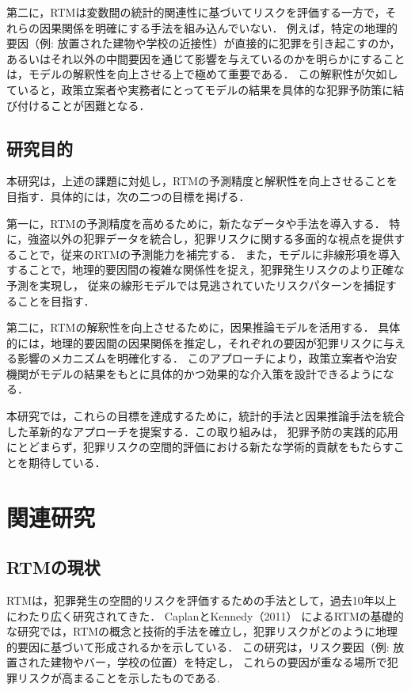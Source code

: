 \documentclass[12pt,a4paper,oneside]{jsbook}
\theoremstyle{plain}
\begin{document}
第二に，RTMは変数間の統計的関連性に基づいてリスクを評価する一方で，それらの因果関係を明確にする手法を組み込んでいない．
例えば，特定の地理的要因（例: 放置された建物や学校の近接性）が直接的に犯罪を引き起こすのか，
あるいはそれ以外の中間要因を通じて影響を与えているのかを明らかにすることは，モデルの解釈性を向上させる上で極めて重要である．
この解釈性が欠如していると，政策立案者や実務者にとってモデルの結果を具体的な犯罪予防策に結び付けることが困難となる．
\section{研究目的}
本研究は，上述の課題に対処し，RTMの予測精度と解釈性を向上させることを目指す．具体的には，次の二つの目標を掲げる．

第一に，RTMの予測精度を高めるために，新たなデータや手法を導入する．
特に，強盗以外の犯罪データを統合し，犯罪リスクに関する多面的な視点を提供することで，従来のRTMの予測能力を補完する．
また，モデルに非線形項を導入することで，地理的要因間の複雑な関係性を捉え，犯罪発生リスクのより正確な予測を実現し，
従来の線形モデルでは見逃されていたリスクパターンを捕捉することを目指す．

第二に，RTMの解釈性を向上させるために，因果推論モデルを活用する．
具体的には，地理的要因間の因果関係を推定し，それぞれの要因が犯罪リスクに与える影響のメカニズムを明確化する．
このアプローチにより，政策立案者や治安機関がモデルの結果をもとに具体的かつ効果的な介入策を設計できるようになる．

本研究では，これらの目標を達成するために，統計的手法と因果推論手法を統合した革新的なアプローチを提案する．この取り組みは，
犯罪予防の実践的応用にとどまらず，犯罪リスクの空間的評価における新たな学術的貢献をもたらすことを期待している．

\chapter{関連研究}
\label{chapter_2}
\section{RTMの現状}
RTMは，犯罪発生の空間的リスクを評価するための手法として，過去10年以上にわたり広く研究されてきた．
CaplanとKennedy（2011）
\cite{caplan2011}
によるRTMの基礎的な研究では，RTMの概念と技術的手法を確立し，犯罪リスクがどのように地理的要因に基づいて形成されるかを示している．
この研究は，リスク要因（例: 放置された建物やバー，学校の位置）を特定し，
これらの要因が重なる場所で犯罪リスクが高まることを示したものである.
\end{document}
